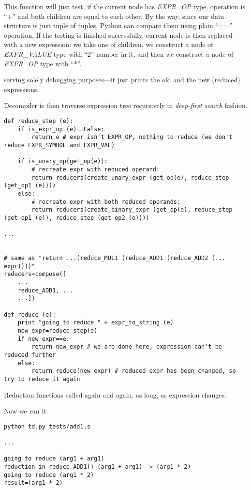 This function will just test, if the current node has \textit{EXPR\_OP} type,
operation is ``+'' and both children are equal to each other.
By the way, since our data structure is just tuple of tuples, Python can compare them using plain ``=='' operation.
If the testing is finished successfully, current node is then replaced with a new expression:
we take one of children, we construct a node of \textit{EXPR\_VALUE} type with ``2'' number in it,
and then we construct a node of \textit{EXPR\_OP} type with ``*''.

 serving solely debugging purposes---it just prints the old and the new (reduced) expressions.

Decompiler is then traverse expression tree recursively in \textit{deep-first search} fashion.

\begin{lstlisting}
def reduce_step (e):
    if is_expr_op (e)==False:
        return e # expr isn't EXPR_OP, nothing to reduce (we don't reduce EXPR_SYMBOL and EXPR_VAL)

    if is_unary_op(get_op(e)):
        # recreate expr with reduced operand:
        return reducers(create_unary_expr (get_op(e), reduce_step (get_op1 (e))))
    else:
        # recreate expr with both reduced operands:
        return reducers(create_binary_expr (get_op(e), reduce_step (get_op1 (e)), reduce_step (get_op2 (e))))

...


# same as "return ...(reduce_MUL1 (reduce_ADD1 (reduce_ADD2 (... expr))))"
reducers=compose([
	...
    reduce_ADD1, ...
    ...])

def reduce (e):
    print "going to reduce " + expr_to_string (e)
    new_expr=reduce_step(e)
    if new_expr==e:
        return new_expr # we are done here, expression can't be reduced further
    else:
        return reduce(new_expr) # reduced expr has been changed, so try to reduce it again
\end{lstlisting}

Reduction functions called again and again, as long, as expression changes.

Now we run it:

\begin{lstlisting}
python td.py tests/add1.s

...

going to reduce (arg1 + arg1)
reduction in reduce_ADD1() (arg1 + arg1) -> (arg1 * 2)
going to reduce (arg1 * 2)
result=(arg1 * 2)
\end{lstlisting}

